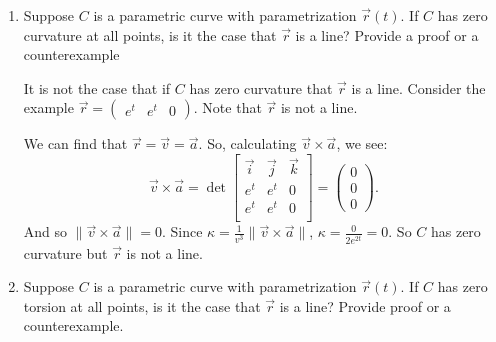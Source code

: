 \documentclass{article}
\begin{document}
\begin{enumerate}
\begin{enumerate}[label= (\alph*)]
\begin{proof}
            $\implies$: Suppose $f$ has zero curvature. That is,
            \[
                \kappa=\frac{f''(x)}{{ (1+f'(x)^{2} })^\frac{3}{2}}=0.
            .\] 
            So $f''(x)=0$. Then $f'(x)=c$ for some $c\in\mathbb{R}$, and $f(x)=cx+d$, for some 
            $d\in \mathbb{R}$. This is the equation of a line.

            So if $f$ has zero curvature, $f$ must be a  line!

            $\impliedby$: Suppose $f$ is a line. That is $f(x)=ax+b$ for some $a,b\in\mathbb{R}$.
            Then $f'(x)=a$ and $f''(x)=0$. Using our formula:
            $$\kappa=\frac{f''(x)}{{ (1+f'(x)^{2} })^\frac{3}{2}}
            =\frac{0}{{ (1+a^{2} })^\frac{3}{2}}=0.$$
            We can see that if $f$ is a line, then $\kappa=0$. 

            Therefore, curvature is zero $\iff$ $f$ is a line.
        \end{proof}

        \item Suppose $C$ is a parametric curve with parametrization $\vec{r}(t)$. If $C$ has
        zero curvature at all points, is it the case that $\vec{r}$ is a line? Provide a proof or a
        counterexample

        It is not the case that if $C$ has zero curvature that $\vec{r}$ is a line. Consider the example 
        $\vec{r}=\begin{pmatrix} e^{t}&e^{t}&0 \end{pmatrix}$. Note that $\vec{r}$ is not a line.

        We can find that $\vec{r}=\vec{v}=\vec{a}$. So, calculating $\vec{v}\times \vec{a}$, we see:
        \[
            \vec{v}\times \vec{a}=\det\begin{bmatrix} \vec{i}&\vec{j}&\vec{k}\\
                e^{t}&e^{t}&0\\
                e^{t}&e^{t}&0\\
            \end{bmatrix} = \begin{pmatrix} 0\\0\\0 \end{pmatrix} 
        .\] 
        And so $\|\vec{v}\times \vec{a}\|=0$. Since $\kappa=\frac{1}{v^3}\|\vec{v}\times \vec{a}\|$, 
        $\kappa=\frac{0}{2e^{2t}}=0$. So $C$ has zero curvature but $\vec{r}$ is not a line.

        \item Suppose $C$ is a parametric curve with parametrization $\vec{r} (t)$. If $C$ has
        zero torsion at all points, is it the case that $\vec{r}$ is a line? Provide proof or a
        counterexample.


\end{enumerate}
\end{enumerate}
\end{document}
